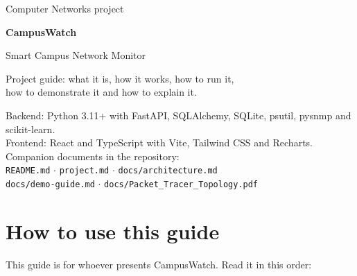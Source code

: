 \documentclass[11pt,a4paper]{article}
\newcommand{\file}[1]{\texttt{\color{ink}#1}}
\begin{document}
\begin{titlepage}
\vspace*{3cm}
{\sffamily\color{accent}\large Computer Networks project\par}
\vspace{6pt}
{\sffamily\bfseries\fontsize{34}{38}\selectfont\color{ink} CampusWatch\par}
\vspace{4pt}
{\sffamily\Large\color{ink} Smart Campus Network Monitor\par}
\vspace{18pt}
{\large\color{muted} Project guide: what it is, how it works, how to run it,\\ how to demonstrate it and how to explain it.\par}
\vspace{2cm}
\vfill
{\sffamily\small\color{muted}
Backend: Python 3.11+ with FastAPI, SQLAlchemy, SQLite, psutil, pysnmp and scikit-learn.\\
Frontend: React and TypeScript with Vite, Tailwind CSS and Recharts.\\[4pt]
Companion documents in the repository:\\
\file{README.md} $\cdot$ \file{project.md} $\cdot$ \file{docs/architecture.md}\\
\file{docs/demo-guide.md} $\cdot$ \file{docs/Packet\_Tracer\_Topology.pdf}\par}
\end{titlepage}

\tableofcontents
\newpage

\section{How to use this guide}

This guide is for whoever presents CampusWatch. Read it in this order:
\end{document}
